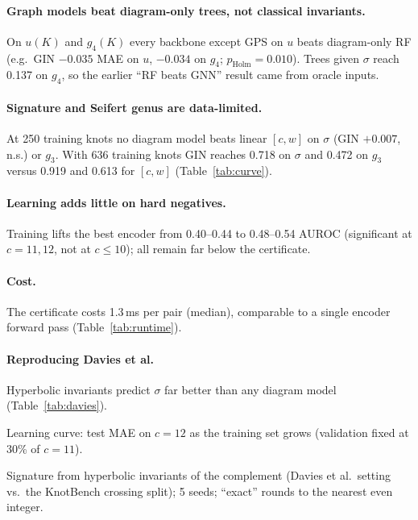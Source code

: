 \documentclass{article}
\begin{document}
\paragraph{Graph models beat diagram-only trees, not classical invariants.}
On $u(K)$ and $g_4(K)$ every backbone except GPS on $u$ beats diagram-only RF
(e.g.\ GIN $-0.035$ MAE on $u$, $-0.034$ on $g_4$; $p_\text{Holm}{=}0.010$).
Trees given $\sigma$ reach 0.137 on $g_4$, so the earlier ``RF beats GNN''
result came from oracle inputs.
\paragraph{Signature and Seifert genus are data-limited.} At 250 training
knots no diagram model beats linear $[c,w]$ on $\sigma$ (GIN $+0.007$, n.s.) or
$g_3$. With 636 training knots GIN reaches 0.718 on $\sigma$ and 0.472 on $g_3$
versus 0.919 and 0.613 for $[c,w]$ (Table~\ref{tab:curve}).
\paragraph{Learning adds little on hard negatives.} Training lifts the best
encoder from 0.40--0.44 to 0.48--0.54 AUROC (significant at $c{=}11,12$, not
at $c{\le}10$); all remain far below the certificate.
\paragraph{Cost.} The certificate costs 1.3\,ms per pair (median), comparable
to a single encoder forward pass (Table~\ref{tab:runtime}).
\paragraph{Reproducing Davies et al.} Hyperbolic invariants predict $\sigma$
far better than any diagram model (Table~\ref{tab:davies}).

\begin{table}[t]
\centering\small
\caption{Learning curve: test MAE on $c{=}12$ as the training set grows
(validation fixed at 30\% of $c{=}11$).}
\label{tab:curve}
\begin{adjustbox}{max width=\linewidth}

\end{adjustbox}
\end{table}

\begin{table}[t]
\centering\small
\caption{Signature from hyperbolic invariants of the complement (Davies et al.\
setting vs.\ the KnotBench crossing split); 5 seeds; ``exact'' rounds to the
nearest even integer.}
\label{tab:davies}

\end{table}
\end{document}
